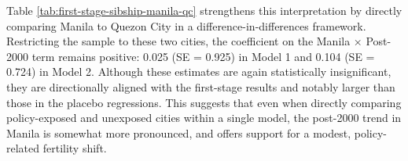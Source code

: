 \documentclass[]{AEA}
\begin{document}
\begin{table}[!h]
\centering\centering
\caption{\label{tab:first-stage-sibship-placebo}Placebo Regressions: Using Quezon City as Falsification Test}
\centering
{}
\end{table}

Table \ref{tab:first-stage-sibship-manila-qc} strengthens this
interpretation by directly comparing Manila to Quezon City in a
difference-in-differences framework. Restricting the sample to these two
cities, the coefficient on the Manila × Post-2000 term remains positive:
0.025 (SE = 0.925) in Model 1 and 0.104 (SE = 0.724) in Model 2.
Although these estimates are again statistically insignificant, they are
directionally aligned with the first-stage results and notably larger
than those in the placebo regressions. This suggests that even when
directly comparing policy-exposed and unexposed cities within a single
model, the post-2000 trend in Manila is somewhat more pronounced, and
offers support for a modest, policy-related fertility shift.
\end{document}

